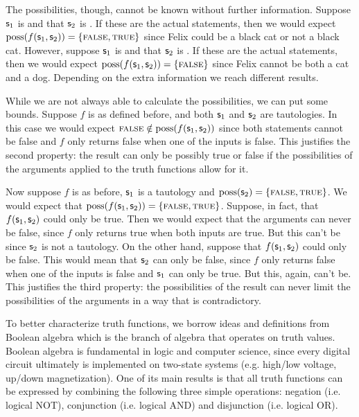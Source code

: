 \documentclass[11pt,letterpaper,fleqn]{memoir} %
\begin{document}
\begin{mathSection}
\begin{justification}
		The possibilities, though, cannot be known without further information. Suppose $\mathsf{s}_1$ is  and that $\mathsf{s}_2$ is . If these are the actual statements, then we would expect $\operatorname{poss}(f(\mathsf{s}_1, \mathsf{s}_2)) = \{\textsc{false}, \textsc{true}\}$ since Felix could be a black cat or not a black cat. However, suppose $\mathsf{s}_1$ is  and that $\mathsf{s}_2$ is . If these are the actual statements, then we would expect $\operatorname{poss}(f(\mathsf{s}_1, \mathsf{s}_2)) = \{\textsc{false}\}$ since Felix cannot be both a cat and a dog. Depending on the extra information we reach different results.
		
		While we are not always able to calculate the possibilities, we can put some bounds. Suppose $f$ is as defined before, and both $\mathsf{s}_1$ and $\mathsf{s}_2$ are tautologies. In this case we would expect $\textsc{false} \notin \operatorname{poss}(f(\mathsf{s}_1, \mathsf{s}_2))$ since both statements cannot be false and $f$ only returns false when one of the inputs is false. This justifies the second property: the result can only be possibly true or false if the possibilities of the arguments applied to the truth functions allow for it.
		
		Now suppose $f$ is as before, $\mathsf{s}_1$ is a tautology and $\operatorname{poss}(\mathsf{s}_2) = \{\textsc{false}, \textsc{true}\}$. We would expect that  $\operatorname{poss}(f(\mathsf{s}_1, \mathsf{s}_2)) = \{\textsc{false}, \textsc{true}\}$. Suppose, in fact, that $f(\mathsf{s}_1, \mathsf{s}_2)$ could only be true. Then we would expect that the arguments can never be false, since $f$ only returns true when both inputs are true. But this can't be since $\mathsf{s}_2$ is not a tautology. On the other hand, suppose that $f(\mathsf{s}_1, \mathsf{s}_2)$ could only be false. This would mean that $\mathsf{s}_2$ can only be false, since $f$ only returns false when one of the inputs is false and $\mathsf{s}_1$ can only be true. But this, again, can't be. This justifies the third property: the possibilities of the result can never limit the possibilities of the arguments in a way that is contradictory.	
	\end{justification}
\end{mathSection}

To better characterize truth functions, we borrow ideas and definitions from Boolean algebra which is the branch of algebra that operates on truth values. Boolean algebra is fundamental in logic and computer science, since every digital circuit ultimately is implemented on two-state systems (e.g. high/low voltage, up/down magnetization).  One of its main results is that all truth functions can be expressed by combining the following three simple operations: negation (i.e. logical NOT), conjunction (i.e. logical AND) and disjunction (i.e. logical OR).
\end{document}
